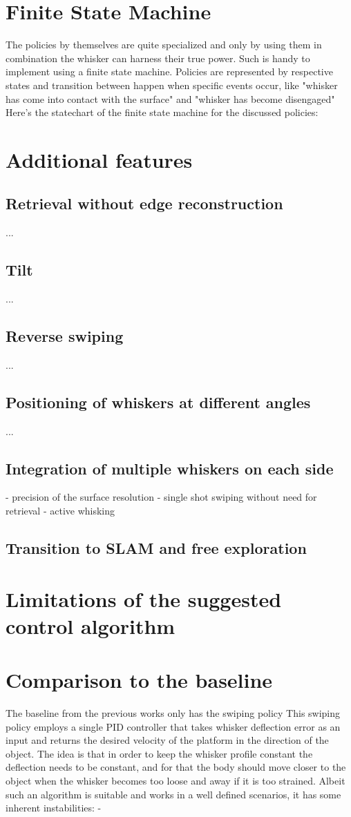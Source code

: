 \section{Finite State Machine}
The policies by themselves are quite specialized and only by using them in combination the whisker can harness their true power.
Such is handy to implement using a finite state machine.
Policies are represented by respective states and transition between happen when specific events occur, like "whisker has come into contact with the surface" and "whisker has become disengaged"
Here's the statechart of the finite state machine for the discussed policies:


\section{Additional features}
\subsection{Retrieval without edge reconstruction}
...
\subsection{Tilt}
...
\subsection{Reverse swiping}
...
\subsection{Positioning of whiskers at different angles}
...
\subsection{Integration of multiple whiskers on each side}
- precision of the surface resolution
- single shot swiping without need for retrieval
- active whisking
\subsection{Transition to SLAM and free exploration}

\section{Limitations of the suggested control algorithm}

\section{Comparison to the baseline}
The baseline from the previous works only has the swiping policy
This swiping policy employs a single PID controller that takes whisker deflection error as an input and returns the desired velocity of the platform in the direction of the object.
The idea is that in order to keep the whisker profile constant the deflection needs to be constant, and for that the body should move closer to the object when the whisker becomes too loose and away if it is too strained.
Albeit such an algorithm is suitable and works in a well defined scenarios, it has some inherent instabilities:
-
